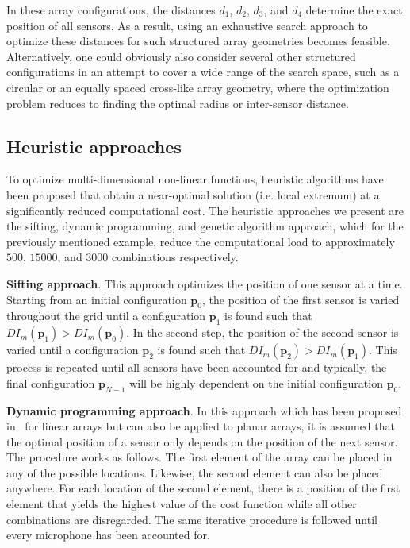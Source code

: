 \documentclass[9pt]{article}
\begin{document}
In these array configurations, the distances $d_1$, $d_2$, $d_3$, and $d_4$ determine the exact position of all sensors. As a result, using an exhaustive search approach to optimize these distances for such structured array geometries becomes feasible. Alternatively, one could obviously also consider several other structured configurations in an attempt to cover a wide range of the search space, such as a circular or an equally spaced cross-like array geometry, where the optimization problem reduces to finding the optimal radius or inter-sensor distance.
\vspace{-0.3cm}
\subsection{Heuristic approaches}
\label{method2}
\vspace{-0.2cm}
To optimize multi-dimensional non-linear functions, heuristic algorithms have been proposed that obtain a near-optimal solution (i.e. local extremum) at a significantly reduced computational cost. The heuristic approaches we present are the sifting, dynamic programming, and genetic algorithm approach, which for the previously mentioned example, reduce the computational load to approximately $500$, $15000$, and $3000$ combinations respectively.

\textbf{Sifting approach}. This approach optimizes the position of one sensor at a time. 
Starting from an initial configuration $\mathbf{p}_{0}$, the position of the first sensor is varied throughout the grid until a configuration $\mathbf{p}_{1}$ is found such that $DI_{m}(\mathbf{p}_1)>DI_{m}(\mathbf{p}_0)$. 
In the second step, the position of the second sensor is varied until a configuration $\mathbf{p}_2$ is found such that $DI_{m}(\mathbf{p}_2) > DI_{m}(\mathbf{p}_1)$. 
This process is repeated until all sensors have been accounted for and typically, the final configuration $\mathbf{p}_{N-1}$ will be highly dependent on the initial configuration $\mathbf{p}_0$.

\textbf{Dynamic programming approach}. In this approach which has been proposed in~\cite{skolnik_dynamic_64} for linear arrays but can also be applied to planar arrays, it is assumed that the optimal position of a sensor only depends on the position of the next sensor. The procedure works as follows. The first element of the array can be placed in any of the possible locations. Likewise, the second element can also be placed anywhere. For each location of the second element, there is a position of the first element that yields the highest value of the cost function while all other combinations are disregarded. The same iterative procedure is followed until every microphone has been accounted for.
 
\end{document}
